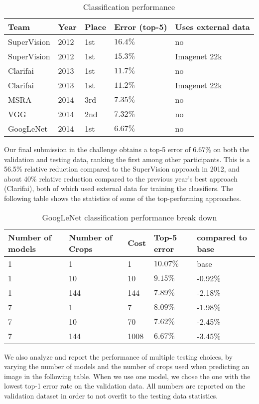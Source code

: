 \begin{table}
\centering
\begin{tabular}[H]{|l||l|l|l|l|}
\hline
{\bf Team} & {\bf Year} & {\bf Place} & {\bf Error (top-5)} & {\bf Uses external data} \\
\hline\hline
SuperVision & 2012 & 1st & $16.4\%$ & no \\
\hline
SuperVision & 2012 & 1st & $15.3\%$ & Imagenet $22$k \\
\hline
Clarifai & 2013 & 1st & $11.7\%$ & no \\
\hline
Clarifai & 2013 & 1st & $11.2\%$ &  Imagenet $22$k \\
\hline
MSRA & 2014 & 3rd & $7.35\%$ & no \\
\hline
VGG & 2014 & 2nd & $7.32\%$ & no \\
\hline
GoogLeNet & 2014 & 1st & $6.67\%$ & no\\
\hline
\end{tabular}
\caption{Classification performance}
\label{classfinal}
\end{table}
Our final submission in the challenge obtains a top-5 error of 6.67\% on both the validation and testing data, ranking the first among other participants. This is a 56.5\% relative reduction compared to the SuperVision approach in 2012, and about 40\% relative reduction compared to the previous year's best approach (Clarifai), both of which used external data for training the classifiers. The following table shows the statistics of some of the top-performing approaches.

\begin{table}
\centering
\begin{tabular}[H]{|l||l|l|l|l|}
\hline
{\bf Number of models} & {\bf Number of Crops} & {\bf Cost} & {\bf Top-5 error} & {\bf compared to base}\\
\hline
1 & 1 & 1 & $10.07\%$ & base \\
\hline
1 & 10 & 10 & $9.15\%$ & -0.92\%\\
\hline
1 & 144 & 144 & $7.89\%$ & -2.18\% \\
\hline
7 & 1 & 7 & $8.09\%$ & -1.98\% \\
\hline
7 & 10 & 70 & $7.62\%$ & -2.45\% \\
\hline
7 & 144 & 1008 & $6.67\%$ & -3.45\% \\
\hline
\end{tabular}
\caption{GoogLeNet classification performance break down}
\label{classbreakdown}
\end{table}

We also analyze and report the performance of multiple testing choices, by varying the number of models and the number of crops used when predicting an image in the following table. When we use one model, we chose the one with the lowest top-1 error rate on the validation data. All numbers are reported on the validation dataset in order to not overfit to the testing data statistics.
